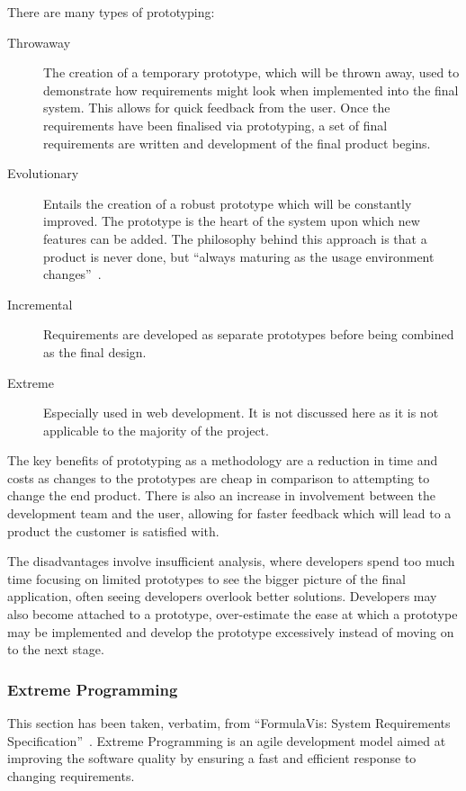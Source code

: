 \documentclass[11pt,a4paper]{article}
\begin{document}
There are many types of prototyping:
\begin{description}
\item[Throwaway] The creation of a temporary prototype, which will be thrown away, used to demonstrate how requirements might look when implemented into the final system. This allows for quick feedback from the user. Once the requirements have been finalised via prototyping, a set of final requirements are written and development of the final product begins.
\item[Evolutionary] Entails the creation of a robust prototype which will be constantly improved. The prototype is the heart of the system upon which new features can be added. The philosophy behind this approach is that a product is never done, but ``always maturing as the usage environment changes''~\cite{spcPrototyping}.
\item[Incremental] Requirements are developed as separate prototypes before being combined as the final design.
\item[Extreme] Especially used in web development. It is not discussed here as it is not applicable to the majority of the project.
\end{description}

The key benefits of prototyping as a methodology are a reduction in time and costs as changes to the prototypes are cheap in comparison to attempting to change the end product. There is also an increase in involvement between the development team and the user, allowing for faster feedback which will lead to a product the customer is satisfied with.

The disadvantages involve insufficient analysis, where developers spend too much time focusing on limited prototypes to see the bigger picture of the final application, often seeing developers overlook better solutions. Developers may also become attached to a prototype, over-estimate the ease at which a prototype may be implemented and develop the prototype excessively instead of moving on to the next stage.

\subsubsection{Extreme Programming}
This section has been taken, verbatim, from ``FormulaVis: System Requirements Specification''~\cite{formulaVis}. Extreme Programming is an agile development model aimed at improving the software quality by ensuring a fast and efficient response to changing requirements.
\end{document}
